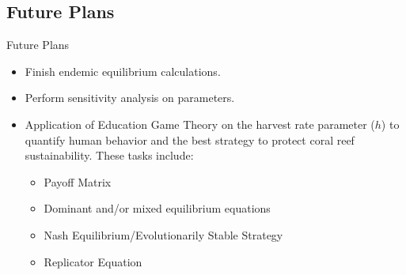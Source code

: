 \documentclass{beamer}
\begin{document}
\subsection{Future Plans}
\begin{frame}{Future Plans}
    \begin{itemize}
        \item Finish endemic equilibrium calculations.
        \item Perform sensitivity analysis on parameters.
        \item Application of Education Game Theory on the harvest rate parameter ($h$) to quantify human behavior and the best strategy to protect coral reef sustainability. These tasks include:
        \begin{itemize}
            \item Payoff Matrix
            \item Dominant and/or mixed equilibrium equations
            \item Nash Equilibrium/Evolutionarily Stable Strategy
            \item Replicator Equation
        \end{itemize}
    \end{itemize}
\end{frame}



\end{document}
